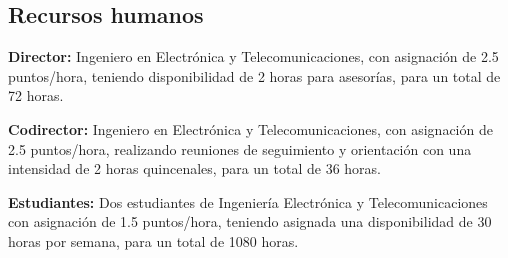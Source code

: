 \documentclass[12pt,letterpaper]{article}
\begin{document}
\subsection*{Recursos humanos}

\textbf{Director:} Ingeniero en Electrónica y Telecomunicaciones, con asignación de 2.5 puntos/hora, teniendo disponibilidad de 2 horas para asesorías, para un total de 72 horas.

\textbf{Codirector:} Ingeniero en Electrónica y Telecomunicaciones, con asignación de 2.5 puntos/hora, realizando reuniones de seguimiento y orientación con una intensidad de 2 horas quincenales, para un total de 36 horas.

\textbf{Estudiantes:} Dos estudiantes de Ingeniería Electrónica y Telecomunicaciones con asignación de 1.5 puntos/hora, teniendo asignada una disponibilidad de 30 horas por semana, para un total de 1080 horas.
\end{document}
